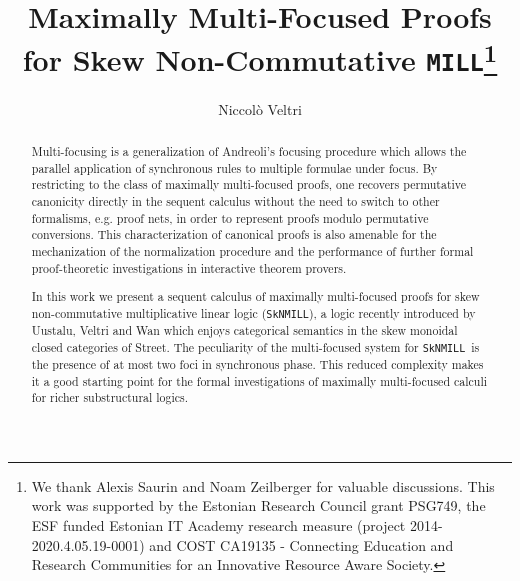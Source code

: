 \documentclass[runningheads]{llncs}
\newcommand{\MILL}{\texttt{MILL}}
\newcommand{\SkNMILL}{\texttt{SkNMILL}}
\begin{document}
\title{Maximally Multi-Focused Proofs for Skew Non-Commutative \MILL\thanks{We thank Alexis Saurin and Noam Zeilberger for valuable discussions. This work was supported by the Estonian Research Council grant PSG749, the ESF funded Estonian IT Academy research measure (project 2014-2020.4.05.19-0001) and COST CA19135 - Connecting Education and Research Communities for an Innovative Resource Aware Society.}}

\author{Niccol{\`o} Veltri}
%
%
\maketitle
%
\begin{abstract}

  Multi-focusing is a generalization of Andreoli's focusing procedure which allows the parallel application of synchronous rules to multiple formulae under focus. By restricting to the class of maximally multi-focused proofs, one recovers permutative canonicity directly in the sequent calculus without the need to switch to other formalisms, e.g. proof nets, in order to  represent proofs modulo permutative conversions. This characterization of canonical proofs is also amenable for the mechanization of the normalization procedure and the performance of further formal proof-theoretic investigations in interactive theorem provers.

  In this work we present a sequent calculus of maximally multi-focused proofs for skew non-commutative multiplicative linear logic (\SkNMILL), a logic recently introduced by Uustalu, Veltri and Wan which enjoys categorical semantics in the skew monoidal closed categories of Street. The peculiarity of the multi-focused system for \SkNMILL\ is the presence of at most two foci in synchronous phase. This reduced complexity makes it a good starting point for the formal investigations of maximally multi-focused calculi for richer substructural logics.
  
\end{abstract}
\end{document}
